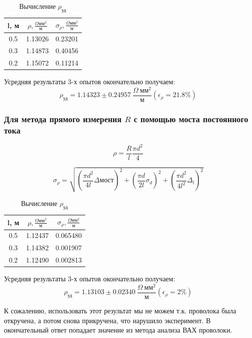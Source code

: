 \documentclass{article}
\begin{document}
	\begin{table}[H]
		\centering
		\begin{tabular}{|c|c|c|}
			\hline
			l, м & $\rho, \frac{\Omega \text{мм}^{2}}{\text{м}}$ & $\sigma_{\rho}, \frac{\Omega \text{мм}^{2}}{\text{м}}$ \\ \hline
			0.5 & 1.13026 & 0.23201 \\ \hline
			0.3 & 1.14873 & 0.40456 \\ \hline
			0.2 & 1.15072 & 0.11214 \\ \hline
		\end{tabular}
		\caption{Вычисление $\rho_{\text{уд}}$}
	\end{table}
	
	Усредняя результаты 3-х опытов окончательно получаем:
	$$\rho_{\text{уд}} = 1.14323 \pm 0.24957 ~\frac{\Omega ~\text{мм}^{2}}{\text{м}} (\epsilon_{\rho} = 21.8 \%)$$
	
	\subsubsection{Для метода прямого измерения $R$ с помощью моста постоянного тока}
	
	$$ \rho = \frac{R}{l}{\frac{{\pi}d^2}{4}} $$
	
	$$\sigma_{\rho} = \sqrt{(\frac{\pi d^{2}}{4l} \Delta{\text{мост}})^{2} +
		(\frac{\pi d}{2l} \sigma_{d})^{2} +
		(\frac{\pi d^{2}}{4l^{2}} \Delta_{l})^{2}}$$
	
	\begin{table}[H]
		\centering
		\begin{tabular}{|c|c|c|}
			\hline
			l, м & $\rho, \frac{\Omega \text{мм}^{2}}{\text{м}}$ & $\sigma_{\rho}, \frac{\Omega \text{мм}^{2}}{\text{м}}$ \\ \hline
			0.5 & 1.12437 & 0.065480 \\ \hline
			0.3 & 1.14382 & 0.001907 \\ \hline
			0.2 & 1.12490 & 0.002813 \\ \hline
		\end{tabular}
		\caption{Вычисление $\rho_{\text{уд}}$}
	\end{table}
	
	Усредняя результаты 3-х опытов окончательно получаем:
	$$\rho_{\text{уд}} = 1.13103 \pm 0.02340 ~\frac{\Omega ~\text{мм}^{2}}{\text{м}} (\epsilon_{\rho} = 2 \%)$$
	
	К сожалению, использовать этот результат мы не можем т.к. проволока была откручена, а потом снова прикручена, что нарушило эксперимент. В окончательный ответ попадает значение из метода анализа ВАХ проволоки.
	
\end{document}
